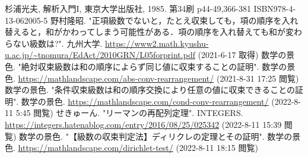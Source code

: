 \documentclass[dvipdfmx]{jsarticle}
\begin{document}
\begin{thebibliography}{50}
  杉浦光夫, 解析入門I, 東京大学出版社, 1985. 第34刷 p44-49,366-381 ISBN978-4-13-062005-5
  野村隆昭. "正項級数でないと，たとえ収束しても，項の順序を入れ替えると，和がかわってしまう可能性がある．項の順序を入れ替えても和が変わらない級数は?". 九州大学. \url{https://www2.math.kyushu-u.ac.jp/~tnomura/EdAct/2010GRN/L05forprint.pdf} (2021-6-17 取得)
  数学の景色. "絶対収束級数は和の順序によらず同じ値に収束することの証明". 数学の景色. \url{https://mathlandscape.com/abs-conv-rearrangement/} (2021-8-31 17:25 閲覧)
  数学の景色. "条件収束級数は和の順序交換により任意の値に収束できることの証明". 数学の景色. \url{https://mathlandscape.com/cond-conv-rearrangement/} (2022-8-11 5:45 閲覧)
  せきゅーん. "リーマンの再配列定理". INTEGERS. \url{https://integers.hatenablog.com/entry/2016/08/25/025342} (2022-8-11 15:39 閲覧)
  数学の景色. "【級数の収束判定法】ディリクレの定理とその証明". 数学の景色. \url{https://mathlandscape.com/dirichlet-test/} (2022-8-11 18:15 閲覧)
\end{thebibliography}
\end{document}
